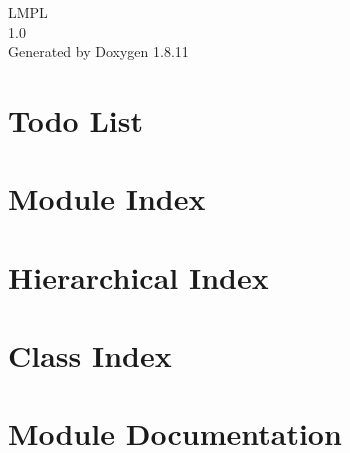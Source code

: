 \documentclass[twoside]{book}
\newcommand{\+}{\discretionary{\mbox{\scriptsize$\hookleftarrow$}}{}{}}
\newcommand{\clearemptydoublepage}{%
  \newpage{\pagestyle{empty}\cleardoublepage}%
}
\begin{document}
\begin{titlepage}
\vspace*{7cm}
\begin{center}%
{\Large L\+M\+PL \\[1ex]\large 1.\+0 }\\
\vspace*{1cm}
{\large Generated by Doxygen 1.8.11}\\
\end{center}
\end{titlepage}
\clearemptydoublepage
\tableofcontents
\clearemptydoublepage
{}

\chapter{Todo List}
\label{todo}

\chapter{Module Index}

\chapter{Hierarchical Index}

\chapter{Class Index}

\chapter{Module Documentation}

\end{document}
